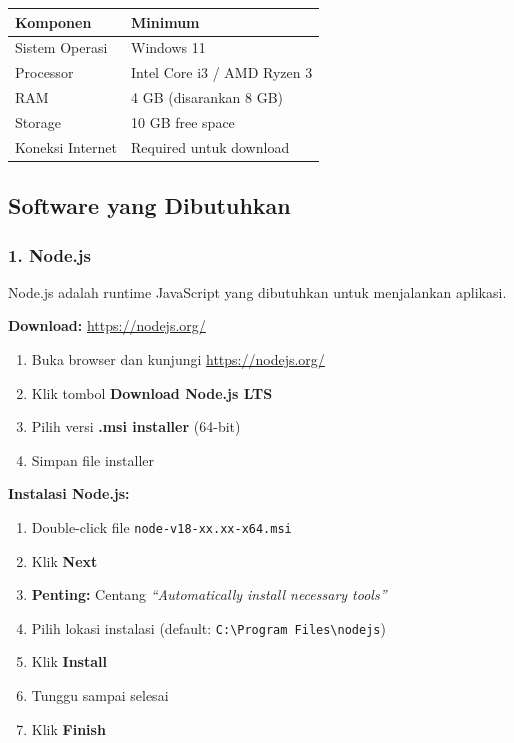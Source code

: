 \documentclass[12pt,a4paper]{article}
\begin{document}
\begin{center}
\begin{tabular}{|l|l|}
    \hline
    \textbf{Komponen} & \textbf{Minimum} \\
    \hline
    Sistem Operasi & Windows 11 \\
    \hline
    Processor & Intel Core i3 / AMD Ryzen 3 \\
    \hline
    RAM & 4 GB (disarankan 8 GB) \\
    \hline
    Storage & 10 GB free space \\
    \hline
    Koneksi Internet & Required untuk download \\
    \hline
\end{tabular}
\end{center}

\subsection{Software yang Dibutuhkan}

\subsubsection{1. Node.js}
Node.js adalah runtime JavaScript yang dibutuhkan untuk menjalankan aplikasi.

\textbf{Download:} \url{https://nodejs.org/}

\begin{enumerate}
    \item Buka browser dan kunjungi \url{https://nodejs.org/}
    \item Klik tombol \textbf{Download Node.js LTS}
    \item Pilih versi \textbf{.msi installer} (64-bit)
    \item Simpan file installer
\end{enumerate}

\textbf{Instalasi Node.js:}
\begin{enumerate}
    \item Double-click file \texttt{node-v18-xx.xx-x64.msi}
    \item Klik \textbf{Next}
    \item \textbf{Penting:} Centang \textit{``Automatically install necessary tools''}
    \item Pilih lokasi instalasi (default: \texttt{C:\textbackslash Program Files\textbackslash nodejs})
    \item Klik \textbf{Install}
    \item Tunggu sampai selesai
    \item Klik \textbf{Finish}
\end{enumerate}
\end{document}
